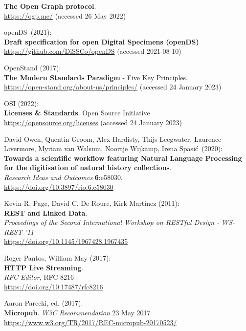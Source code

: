 \begin{thebibliography}{9}
\textbf{The {Open Graph} protocol}.  \\
\url{https://ogp.me/}
(accessed 26 May 2022)

openDS~(2021):\\
\textbf{Draft specification for open Digital Specimens (openDS)}\\
\url{https://github.com/DiSSCo/openDS} (accessed 2021-08-10)


OpenStand (2017): \\
\textbf{The {Modern Standards Paradigm}} - {Five Key Principles}.\\
\url{https://open-stand.org/about-us/principles/} (accessed 24 January
2023)

OSI (2022): \\
\textbf{Licenses \& {Standards}}.
Open Source Initiative\\
\url{https://opensource.org/licenses} (accessed 24 January 2023)

David Owen, Quentin Groom, Alex Hardisty, Thijs Leegwater, Laurence Livermore, Myriam van Walsum, Noortje Wijkamp, Irena Spasić~(2020):\\
\textbf{Towards a scientific workflow featuring Natural
Language Processing for the digitisation of natural history collections}.\\
\emph{Research Ideas and Outcomes} \textbf{6}:e58030.\\
\url{https://doi.org/10.3897/rio.6.e58030}

Kevin R. Page, David C. De Roure, Kirk Martinez (2011): \\
\textbf{{REST} and {Linked Data}}. \\
\emph{Proceedings of the {Second International Workshop} on {RESTful Design} - {WS-REST} '11} \\
\url{https://doi.org/10.1145/1967428.1967435}

Roger Pantos, William May (2017): \\
\textbf{HTTP Live Streaming}. \\
\emph{RFC Editor}, RFC 8216\\
\url{https://doi.org/10.17487/rfc8216}

Aaron Parecki, ed. (2017): \\
\textbf{Micropub}. 
\emph{W3C Recommendation} 23 May 2017\\
\url{https://www.w3.org/TR/2017/REC-micropub-20170523/}


\end{thebibliography}
